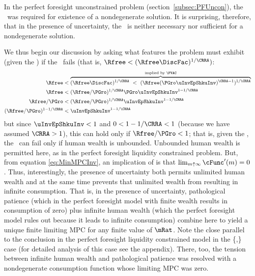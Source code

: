 \documentclass[BufferStockTheory]{subfiles}
\begin{document}
In the perfect foresight unconstrained problem
(section~\ref{subsec:PFUncon}), the \RIC~was required for existence of
a nondegenerate solution.  It is surprising, therefore, that in the
presence of uncertainty, the \RIC~is neither necessary nor sufficient
for a nondegenerate solution.
\begin{comment}
  But if the \RIC~does hold, some useful results can be derived.  Arguably
  the most fundamental are that the limiting values
  for the minimal and maximal marginal propensities to consume implicit in
  \eqref{eq:MaxMPCInv} and \eqref{eq:MinMPCInv} are positive and finite.
\end{comment}
We thus begin our discussion by asking what features the problem must
exhibit (given the \FVAC) if the \RIC~fails (that is, $\Rfree < (\Rfree \DiscFac)^{1/\CRRA})$:
\begin{equation}\begin{gathered}\begin{aligned}
  \Rfree   & < \overbrace{(\Rfree \DiscFac)^{1/\CRRA} ~ < ~ (\Rfree (\PGro \uInvEpShkuInv)^{\CRRA-1})^{1/\CRRA}}^{\text{implied by \FVAC}} \notag
  \\  \Rfree   & < (\Rfree/\PGro)^{1/\CRRA}\PGro \uInvEpShkuInv^{1-1/\CRRA} \notag
  \\  \Rfree/\PGro  & < (\Rfree/\PGro)^{1/\CRRA}\uInvEpShkuInv^{1-1/\CRRA} \notag
  \\  (\Rfree/\PGro)^{1-1/\CRRA}  & < \uInvEpShkuInv^{1-1/\CRRA} \label{eq:RICimplies}
\end{aligned}\end{gathered}\end{equation}
but since $\uInvEpShkuInv<1$ and $0 < 1-1/\CRRA < 1$ (because we have
assumed $\CRRA > 1$), this can hold only if $\Rfree/\PGro < 1$; that
is, given the \FVAC, the \RIC~can fail only if human wealth is
unbounded.  Unbounded human wealth is permitted here, as in the
perfect foresight liquidity constrained problem.  But,
from  equation
\eqref{eq:MinMPCInv}, an implication of \cncl{\RIC} is that $\lim_{m
  \uparrow \infty} \cFunc^{\prime}(m) = 0$.  Thus, interestingly,
the presence of uncertainty both permits unlimited human wealth and at
the same time prevents that unlimited wealth from resulting in
infinite consumption.  That is, in the presence of uncertainty,
pathological patience (which in the perfect foresight model with
finite wealth results in consumption of zero) plus infinite human
wealth (which the perfect foresight model rules out because it leads
to infinite consumption) combine here to yield a unique finite
limiting MPC for any finite value of $\mRat$.  Note
the close parallel to the conclusion in the perfect foresight
liquidity constrained model in the
\{\PFGIC,\cncl{\RIC}\} case (for detailed analysis of this
case see the appendix).  There, too, the tension between infinite human wealth
and pathological patience was resolved with a nondegenerate consumption function
whose limiting MPC was zero.
\end{document}
